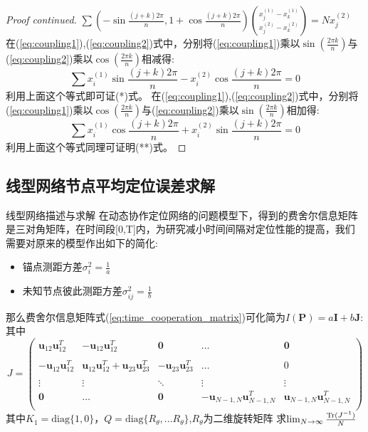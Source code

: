\begin{proof}[Proof continued]
$\sum (-\sin\frac{(j+k)2\pi}{n},1+\cos\frac{(j+k)2\pi}{n})\binom{x_j^{(1)}-x_k^{(1)}}{x_j^{(2)}-x_k^{(2)}}=Nx_j^{(2)}
$\\
在(\ref{eq:coupling1}),(\ref{eq:coupling2})式中，分别将(\ref{eq:coupling1})乘以$\sin(\frac{2\pi k}{n})$与(\ref{eq:coupling2})乘以$\cos(\frac{2\pi k}{n})$相减得:
\begin{equation}
\sum x_i^{(1)}\sin\frac{(j+k)2\pi}{n}-x_i^{(2)}\cos\frac{(j+k)2\pi}{n}=0
\end{equation}
利用上面这个等式即可证(*)式。
在(\ref{eq:coupling1}),(\ref{eq:coupling2})式中，分别将(\ref{eq:coupling1})乘以$\cos(\frac{2\pi k}{n})$与(\ref{eq:coupling2})乘以$\sin(\frac{2\pi k}{n})$相加得:
\begin{equation}
\sum x_i^{(1)}\cos\frac{(j+k)2\pi}{n}+x_i^{(2)}\sin\frac{(j+k)2\pi}{n}=0
\end{equation}
利用上面这个等式同理可证明(**)式。
\end{proof}

\subsection{线型网络节点平均定位误差求解}
{线型网络描述与求解}
在动态协作定位网络的问题模型下，得到的费舍尔信息矩阵是三对角矩阵，在时间段[0,T]内，为研究减小时间间隔对定位性能的提高，我们需要对原来的模型作出如下的简化:
\begin{itemize}
\item 锚点测距方差$\sigma_i^2=\frac{1}{a}$
\item 未知节点彼此测距方差$\sigma^2_{ij}=\frac{1}{b}$
\end{itemize}
那么费舍尔信息矩阵式(\ref{eq:time_cooperation_matrix})可化简为$I(\bm{P})=a\bm{I}+b\bm{J}$:
其中\[
J=\left(
\begin{array}{ccccc}
\bm{u}_{12}\bm{u}_{12}^T&-\bm{u}_{12}\bm{u}_{12}^T&\bm{0}&\dots&\bm{0}\\
&&&&\\
-\bm{u}_{12}\bm{u}_{12}^T&\bm{u}_{12}\bm{u}_{12}^T+\bm{u}_{23}\bm{u}_{23}^T&-\bm{u}_{23}\bm{u}_{23}^T&\dots&0\\
&&&&\\
\vdots &\vdots&\ddots &\vdots&\vdots\\
\bm{0}&\dots&\bm{0}&-\bm{u}_{N-1,N}\bm{u}_{N-1,N}^T&\bm{u}_{N-1,N}\bm{u}_{N-1,N}^T\\
\end{array}
\right)
\]
其中$K_1=\text{diag}\{1,0\}$，$Q=\text{diag}\{R_{\theta},...R_{\theta}\}$,$R_{\theta}$为二维旋转矩阵
求$\lim_{N\to \infty}\frac{\operatorname{Tr}(J^{-1})}{N}$


